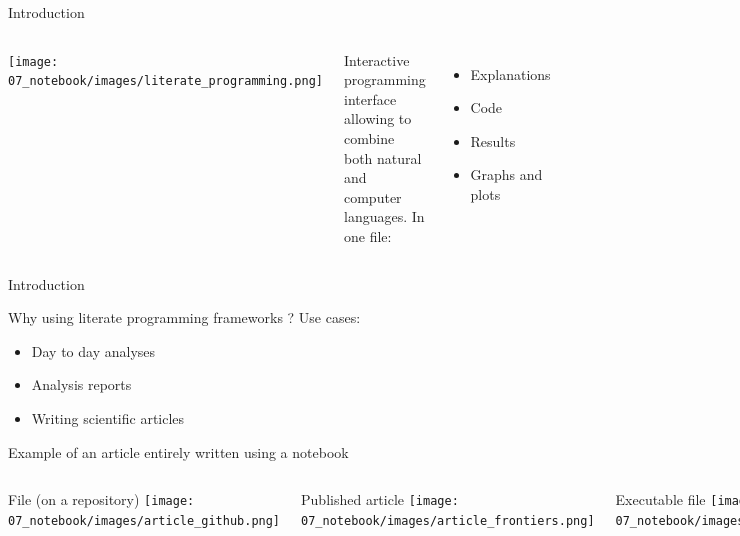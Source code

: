 \begin{frame}{Introduction}
\begin{columns}

\centering\texttt{[image: 07\_notebook/images/literate\_programming.png]}

Interactive programming interface allowing to combine both natural and computer languages.
\newline
\newline
In one file:
\begin{itemize}
  \item Explanations
  \item Code
  \item Results
  \item Graphs and plots
\end{itemize}

\end{columns}
\end{frame}

\begin{frame}{Introduction}

Why using literate programming frameworks ?\newline
\newline
Use cases:
\begin{itemize}
  \item Day to day analyses
  \item Analysis reports
  \item Writing scientific articles
\end{itemize}

\end{frame}

\begin{frame}{Example of an article entirely written using a notebook}
\begin{columns}

File (on a repository)\newline
\newline
\centering\texttt{[image: 07\_notebook/images/article\_github.png]}

Published article\newline
\newline
\centering\texttt{[image: 07\_notebook/images/article\_frontiers.png]}

Executable file\newline
\newline
\centering\texttt{[image: 07\_notebook/images/article\_nbviewer.png]}

\end{columns}

\end{frame}

